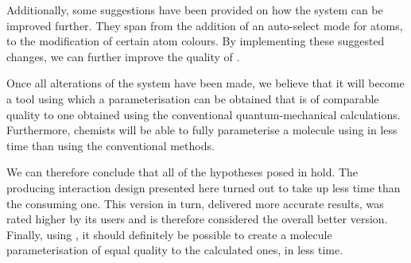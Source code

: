 Additionally, some suggestions have been provided on how the system can be improved further. They span from the addition of an auto-select mode for atoms, to the modification of certain atom colours. By implementing these suggested changes, we can further improve the quality of \oframp.

Once all alterations of the system have been made, we believe that it will become a tool using which a parameterisation can be obtained that is of comparable quality to one obtained using the conventional quantum-mechanical calculations. Furthermore, chemists will be able to fully parameterise a molecule using \oframp{} in less time than using the conventional methods.

We can therefore conclude that all of the hypotheses posed in  hold. The producing interaction design presented here turned out to take up less time than the consuming one. This version in turn, delivered more accurate results, was rated higher by its users and is therefore considered the overall better version. Finally, using \oframp, it should definitely be possible to create a molecule parameterisation of equal quality to the calculated ones, in less time.
